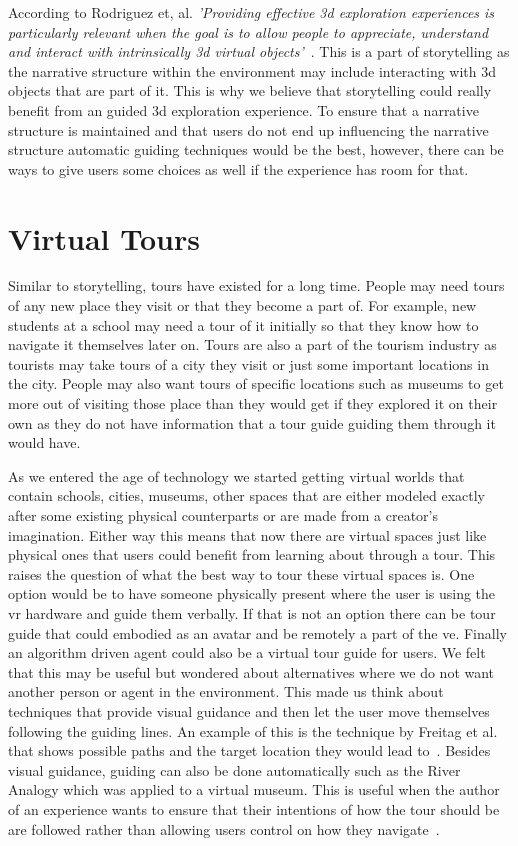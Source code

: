 According to Rodriguez et, al. \textit{'Providing effective \acrshort{3d} exploration	experiences is particularly relevant when the goal is to allow people to appreciate, understand and interact with intrinsically \acrshort{3d} virtual objects'}~\cite{Rodriguez2015}. This is a part of storytelling as the narrative structure within the environment may include interacting with \acrshort{3d} objects that are part of it. This is why we believe that storytelling could really benefit from an guided \acrshort{3d} exploration experience. To ensure that a narrative structure is maintained and that users do not end up influencing the narrative structure automatic guiding techniques would be the best, however, there can be ways to give users some choices as well if the experience has room for that. 

\section{Virtual Tours}
\label{section GJM: Virtual Tours}
Similar to storytelling, tours have existed for a long time. People may need tours of any new place they visit or that they become a part of. For example, new students at a school may need a tour of it initially so that they know how to navigate it themselves later on. Tours are also a part of the tourism industry as tourists may take tours of a city they visit or just some important locations in the city. People may also want tours of specific locations such as museums to get more out of visiting those place than they would get if they explored it on their own as they do not have information that a tour guide guiding them through it would have. 

As we entered the age of technology we started getting virtual worlds that contain schools, cities, museums, other spaces that are either modeled exactly after some existing physical counterparts or are made from a creator's imagination. Either way this means that now there are virtual spaces just like physical ones that users could benefit from learning about through a tour. This raises the question of what the best way to tour these virtual spaces is. One option would be to have someone physically present where the user is using the \acrshort{vr} hardware and guide them verbally. If that is not an option there can be tour guide that could embodied as an avatar and be remotely a part of the \acrshort{ve}. Finally an algorithm driven agent could also be a virtual tour guide for users. We felt that this may be useful but wondered about alternatives where we do not want another person or agent in the environment. This made us think about techniques that provide visual guidance and then let the user move themselves following the guiding lines. An example of this is the technique by Freitag et al. that shows possible paths and the target location they would lead to~\cite{Freitag2018}. Besides visual guidance, guiding can also be done automatically such as the River Analogy which was applied to a virtual museum. This is useful when the author of an experience wants to ensure that their intentions of how the tour should be are followed rather than allowing users control on how they navigate~\cite{Galyean1995}.

